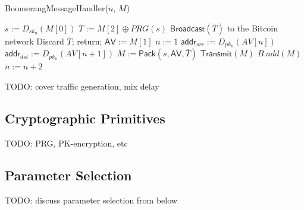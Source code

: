 \begin{algorithm*}[t!]
\caption{{\sf BoomerangMessageHandler}($n$, $M$)}
\label{alg:handler}
\begin{algorithmic}[1]

\State $s := D_{sk_{n}}(M[0])$
\State $\bar{T} := M[2] \oplus PRG(s)$
	\State $\mathsf{Broadcast}(\bar{T})$ to the Bitcoin network
	\State Discard $\bar{T}$; return;
\Else
	\State $\mathsf{AV} := M[1]$
	\State $n := 1$
		\State $\mathsf{addr}_{src} := D_{pk_n}(AV[n])$
			\State $\mathsf{addr}_{dst} := D_{pk_n}(AV[n + 1])$
			\State $M := \mathsf{Pack}(s, \mathsf{AV}, \bar{T})$
				\State $\mathsf{Transmit}(M)$
			\Else
				\State $B.add(M)$
			\EndIf
		\Else
			\State $n := n + 2$
		\EndIf
	\EndWhile
\EndIf

\end{algorithmic}
\end{algorithm*}

TODO: cover traffic generation, mix delay

\subsection{Cryptographic Primitives}

TODO: PRG, PK-encryption, etc


\subsection{Parameter Selection}

TODO: discuss parameter selection from below


